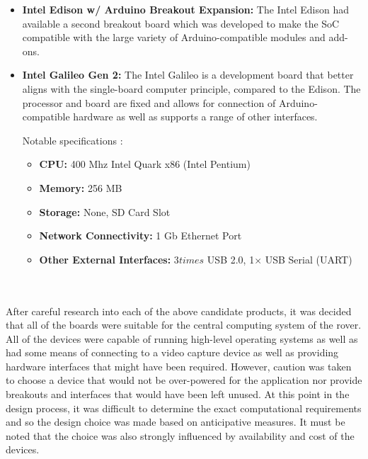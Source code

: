 \begin{itemize}
        \item \textbf{Intel Edison w/ Arduino Breakout Expansion:}
          The Intel Edison had available a second breakout board which was developed to make the SoC compatible with the large variety of Arduino-compatible modules and add-ons.

        \item \textbf{Intel Galileo Gen 2:}
          The Intel Galileo is a development board that better aligns with the single-board computer principle, compared to the Edison. The processor and board are fixed and allows for connection of Arduino-compatible hardware as well as supports a range of other interfaces.
          
          Notable specifications \cite{intelGalileo_2016}:
          \begin{itemize}
            \item \textbf{CPU:} 400 Mhz Intel Quark x86 (Intel Pentium)
            \item \textbf{Memory:} 256 MB
            \item \textbf{Storage:} None, SD Card Slot
            \item \textbf{Network Connectivity:} 1 Gb Ethernet Port
            \item \textbf{Other External Interfaces:} 3$times$ USB 2.0, 1$\times$ USB Serial (UART)
          \end{itemize}
      \end{itemize}
      
      \\\\
        After careful research into each of the above candidate products, it was decided that all of the boards were suitable for the central computing system of the rover. All of the devices were capable of running high-level operating systems as well as had some means of connecting to a video capture device as well as providing hardware interfaces that might have been required. However, caution was taken to choose a device that would not be over-powered for the application nor provide breakouts and interfaces that would have been left unused. At this point in the design process, it was difficult to determine the exact computational requirements and so the design choice was made based on anticipative measures. It must be noted that the choice was also strongly influenced by availability and cost of the devices.
        
